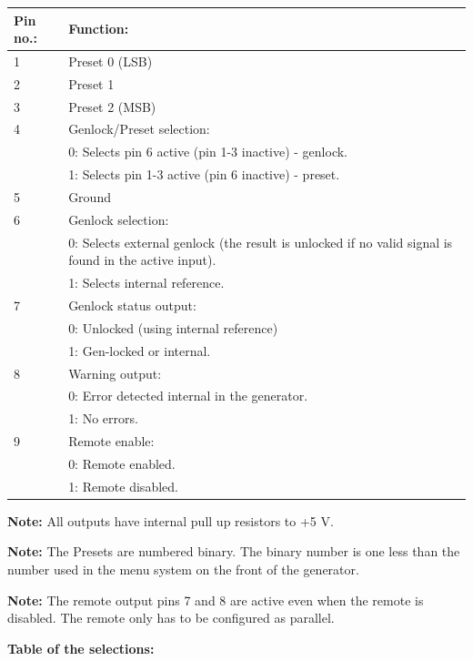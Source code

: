 \begin{tabular*}{\textwidth}{@{\extracolsep{\fill}}|l|p{28em}|}
\hline
\textbf{Pin no.:} & \textbf{Function:} \\ \hline
1 & Preset 0 (LSB) \\ \hline
2 & Preset 1 \\ \hline
3 & Preset 2 (MSB) \\ \hline
4 & Genlock/Preset selection: \\
  & 0: Selects pin 6 active (pin 1-3 inactive) - genlock. \\ 
  & 1: Selects pin 1-3 active (pin 6 inactive) - preset. \\ \hline
5 & Ground \\ \hline
6 & Genlock selection: \\
  & 0: Selects external genlock (the result is unlocked if no valid signal is found in the active input). \\
  & 1: Selects internal reference. \\ \hline
7 & Genlock status output: \\
  & 0: Unlocked (using internal reference) \\
  & 1: Gen-locked or internal. \\ \hline
8 & Warning output: \\
  & 0: Error detected internal in the generator. \\
  & 1: No errors. \\ \hline
9 & Remote enable: \\
  & 0: Remote enabled. \\
  & 1: Remote disabled. \\ \hline
\end{tabular*}

\textbf{Note:} All outputs have internal pull up resistors to +5 V.

\textbf{Note:} The Presets are numbered binary. The binary number is one less than the number used in the menu system on the front of the generator.

\textbf{Note:} The remote output pins 7 and 8 are active even when the remote is disabled. The remote only has to be configured as parallel.

\textbf{Table of the selections:}

